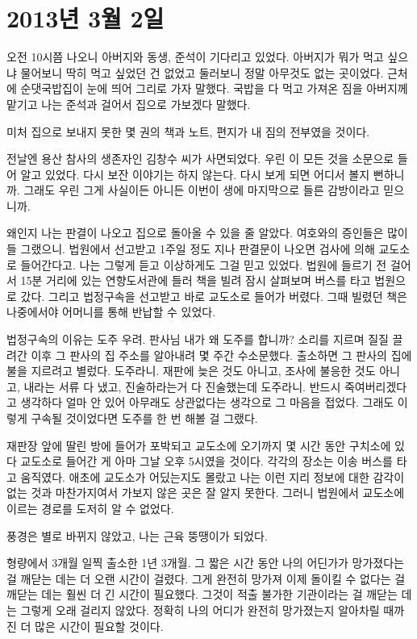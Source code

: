 \documentclass[12pt, b6paper, openany]{memoir}
\newenvironment{article}{}{}
\begin{document}
\begin{article}
\hypertarget{uxb144-3uxc6d4-2uxc77c}{%
\chapter{2013년 3월 2일}\label{uxb144-3uxc6d4-2uxc77c}}

오전 10시쯤 나오니 아버지와 동생, 준석이 기다리고 있었다. 아버지가 뭐가 먹고 싶으냐 물어보니 딱히 먹고 싶었던 건 없었고 둘러보니 정말 아무것도 없는 곳이었다. 근처에 순댓국밥집이 눈에 띄어 그리로 가자 말했다. 국밥을 다 먹고 가져온 짐을 아버지께 맡기고 나는 준석과 걸어서 집으로 가보겠다 말했다.

미처 집으로 보내지 못한 몇 권의 책과 노트, 편지가 내 짐의 전부였을 것이다.

전날엔 용산 참사의 생존자인 김창수 씨가 사면되었다. 우린 이 모든 것을 소문으로 들어 알고 있었다. 다시 보잔 이야기는 하지 않는다. 다시 보게 되면 어디서 볼지 뻔하니까. 그래도 우린 그게 사실이든 아니든 이번이 생에 마지막으로 들른 감방이라고 믿으니까.

왜인지 나는 판결이 나오고 집으로 돌아올 수 있을 줄 알았다. 여호와의 증인들은 많이들 그랬으니. 법원에서 선고받고 1주일 정도 지나 판결문이 나오면 검사에 의해 교도소로 들어간다고. 나는 그렇게 듣고 이상하게도 그걸 믿고 있었다. 법원에 들르기 전 걸어서 15분 거리에 있는 연향도서관에 들러 책을 빌려 잠시 살펴보며 버스를 타고 법원으로 갔다. 그리고 법정구속을 선고받고 바로 교도소로 들어가 버렸다. 그때 빌렸던 책은 나중에서야 어머니를 통해 반납할 수 있었다.

법정구속의 이유는 도주 우려. 판사님 내가 왜 도주를 합니까? 소리를 지르며 질질 끌려간 이후 그 판사의 집 주소를 알아내려 몇 주간 수소문했다. 출소하면 그 판사의 집에 불을 지르려고 별렀다. 도주라니. 재판에 늦은 것도 아니고, 조사에 불응한 것도 아니고, 내라는 서류 다 냈고, 진술하라는거 다 진술했는데 도주라니. 반드시 죽여버리겠다고 생각하다 얼마 안 있어 아무래도 상관없다는 생각으로 그 마음을 접었다. 그래도 이렇게 구속될 것이었다면 도주를 한 번 해볼 걸 그랬다.

재판장 앞에 딸린 방에 들어가 포박되고 교도소에 오기까지 몇 시간 동안 구치소에 있다 교도소로 들어간 게 아마 그날 오후 5시였을 것이다. 각각의 장소는 이송 버스를 타고 움직였다. 애초에 교도소가 어딨는지도 몰랐고 나는 이런 지리 정보에 대한 감각이 없는 것과 마찬가지여서 가보지 않은 곳은 잘 알지 못한다. 그러니 법원에서 교도소에 이르는 경로를 도저히 알 수 없었다.

풍경은 별로 바뀌지 않았고, 나는 근육 뚱땡이가 되었다.

형량에서 3개월 일찍 출소한 1년 3개월. 그 짧은 시간 동안 나의 어딘가가 망가졌다는 걸 깨닫는 데는 더 오랜 시간이 걸렸다. 그게 완전히 망가져 이제 돌이킬 수 없다는 걸 깨닫는 데는 훨씬 더 긴 시간이 필요했다. 그것이 적출 불가한 기관이라는 걸 깨닫는 데는 그렇게 오래 걸리지 않았다. 정확히 나의 어디가 완전히 망가졌는지 알아차릴 때까진 더 많은 시간이 필요할 것이다.


\end{article}
\end{document}
